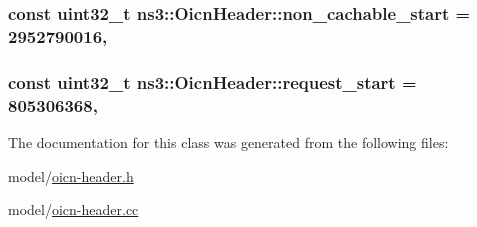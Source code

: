 \hypertarget{classns3_1_1OicnHeader_a822030e2b6549b78e31c440f4fe1f458}{
\subsubsection[{non\-\_\-cachable\-\_\-start}]{\setlength{\rightskip}{0pt plus 5cm}const uint32\-\_\-t ns3\-::\-Oicn\-Header\-::non\-\_\-cachable\-\_\-start = 2952790016\hspace{0.3cm}{\ttfamily [static]}, {\ttfamily [private]}}}\label{classns3_1_1OicnHeader_a822030e2b6549b78e31c440f4fe1f458}
\hypertarget{classns3_1_1OicnHeader_a9fa69f9639455b3ed94cbb616e2809c0}{
\subsubsection[{request\-\_\-start}]{\setlength{\rightskip}{0pt plus 5cm}const uint32\-\_\-t ns3\-::\-Oicn\-Header\-::request\-\_\-start = 805306368\hspace{0.3cm}{\ttfamily [static]}, {\ttfamily [private]}}}\label{classns3_1_1OicnHeader_a9fa69f9639455b3ed94cbb616e2809c0}


The documentation for this class was generated from the following files\-:\begin{DoxyCompactItemize}
\item 
model/\hyperlink{oicn-header_8h}{oicn-\/header.\-h}\item 
model/\hyperlink{oicn-header_8cc}{oicn-\/header.\-cc}\end{DoxyCompactItemize}
